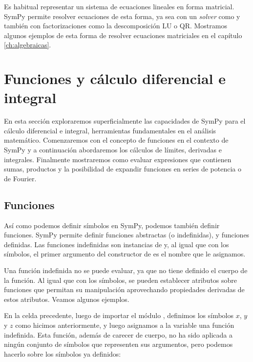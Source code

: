 Es habitual representar un sistema de ecuaciones lineales en forma matricial. SymPy permite resolver ecuaciones de esta forma, ya sea con un \textit{solver} como  y también con factorizaciones como la descomposición LU o QR. Mostramos algunos ejemplos de esta forma de resolver ecuaciones matriciales en el capítulo \ref{ch:algebraicas}.


\section{Funciones y cálculo diferencial e integral}
En esta sección exploraremos superficialmente las capacidades de SymPy para el cálculo diferencial e integral, herramientas fundamentales en el análisis matemático. Comenzaremos con el concepto de funciones en el contexto de SymPy y a continuación abordaremos los cálculos de límites, derivadas e integrales. Finalmente mostraremos como evaluar expresiones que contienen sumas, productos y la posibilidad de expandir funciones en series de potencia o de Fourier.

\subsection{Funciones}
Así como podemos definir símbolos en SymPy, podemos también definir funciones. SymPy permite definir funciones abstractas (o indefinidas), y funciones definidas. Las funciones indefinidas son instancias de  y, al igual que con los símbolos, el primer argumento del constructor de  es el nombre que le asignamos.

Una función indefinida no se puede evaluar, ya que no tiene definido el cuerpo de la función. Al igual que con los símbolos, se pueden establecer atributos sobre funciones que permitan su manipulación aprovechando propiedades derivadas de estos atributos. Veamos algunos ejemplos.


En la celda precedente, luego de importar el módulo , definimos los  símbolos $x$, $y$ y $z$ como hicimos anteriormente, y luego asignamos a la variable  una función indefinida. Esta función, además de carecer de cuerpo, no ha sido aplicada a ningún conjunto de símbolos que representen sus argumentos, pero podemos hacerlo sobre los símbolos ya definidos: 


